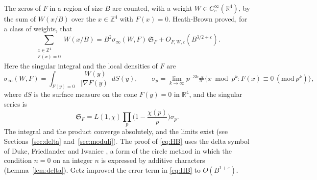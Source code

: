 \documentclass[11pt]{amsart}
\numberwithin{equation}{section}
\numberwithin{figure}{section}
\theoremstyle{definition}
\newcommand{\Z}{\mathbb{Z}}
\newcommand{\R}{\mathbb{R}}
\newcommand{\F}{\mathcal{F}}
\newcommand{\imod}[1]{\ (\mathrm{mod}\ #1)}
\renewcommand{\S}{\mathfrak{S}}
\newcommand{\eps}{\varepsilon}
\newcommand{\abs}[1]{\lvert #1\rvert}
\begin{document}
The zeros of $F$ in a region of size $B$ are counted, with a weight
$W\in C_c^\infty(\R^4)$, by the sum of $W(x/B)$ over the $x\in\Z^4$
with $F(x)=0$.
Heath-Brown \cite[Theorem~6]{HB} proved, for a class of weights,
that
\begin{equation}\label{eq:HB}
 \sum_{\substack{x\in\Z^4\\F(x)=0}}W(x/B)
 =B^2\sigma_\infty(W,F)\,\S_F+O_{F,W,\eps}(B^{3/2+\eps}).
\end{equation}
Here the singular integral and the local densities of $F$ are
\begin{equation}\label{eq:singint}
 \sigma_\infty(W,F)=\int_{F(y)=0}\frac{W(y)}{\abs{\nabla F(y)}}\,dS(y),
 \qquad
 \sigma_p=\lim_{k\to\infty}p^{-3k}\#\{x\bmod p^k:F(x)\equiv0\imod{p^k}\},
\end{equation}
where $dS$ is the surface measure on the cone $F(y)=0$ in $\R^4$, and
the singular series is
\begin{equation}\label{eq:SF}
 \S_F=L(1,\chi)\prod_p\Big(1-\frac{\chi(p)}p\Big)\sigma_p.
\end{equation}
The integral and the product converge absolutely, and the limits exist (see Sections~\ref{sec:delta} and~\ref{sec:moduli}).
The proof of \eqref{eq:HB} uses the delta symbol of Duke, Friedlander and Iwaniec \cite{DFI}, a form of the circle method in which the condition $n=0$ on an integer $n$ is expressed by additive characters (Lemma~\ref{lem:delta}).
Getz \cite[Theorem~1.1]{G} improved the error term in \eqref{eq:HB} to
$O(B^{1+\eps})$.
\end{document}
